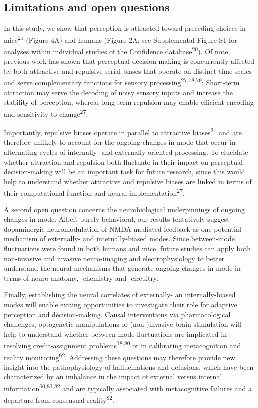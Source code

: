 \documentclass[
]{article}
\begin{document}
\hypertarget{limitations-and-open-questions}{%
\subsection{Limitations and open
questions}\label{limitations-and-open-questions}}

In this study, we show that perception is attracted toward preceding
choices in mice\textsuperscript{21} (Figure 4A) and humans (Figure 2A;
see Supplemental Figure S1 for analyses within individual studies of the
Confidence database\textsuperscript{20}). Of note, previous work has
shown that perceptual decision-making is concurrently affected by both
attractive and repulsive serial biases that operate on distinct
time-scales and serve complementary functions for sensory
processing\textsuperscript{27,78,79}: Short-term attraction may serve
the decoding of noisy sensory inputs and increase the stability of
perception, whereas long-term repulsion may enable efficient encoding
and sensitivity to change\textsuperscript{27}.

Importantly, repulsive biases operate in parallel to attractive
biases\textsuperscript{27} and are therefore unlikely to account for the
ongoing changes in mode that occur in alternating cycles of internally-
and externally-oriented processing. To elucidate whether attraction and
repulsion both fluctuate in their impact on perceptual decision-making
will be an important task for future research, since this would help to
understand whether attractive and repulsive biases are linked in terms
of their computational function and neural
implementation\textsuperscript{27}.

A second open question concerns the neurobiological underpinnings of
ongoing changes in mode. Albeit purely behavioral, our results
tentatively suggest dopaminergic neuromodulation of NMDA-mediated
feedback as one potential mechanism of externally- and internally-biased
modes. Since between-mode fluctuations were found in both humans and
mice, future studies can apply both non-invasive and invasive
neuro-imaging and electrophysiology to better understand the neural
mechanisms that generate ongoing changes in mode in terms of
neuro-anatomy, -chemistry and -circuitry.

Finally, establishing the neural correlates of externally- an
internally-biased modes will enable exiting opportunities to investigate
their role for adaptive perception and decision-making. Causal
interventions via pharmacological challenges, optogenetic manipulations
or (non-)invasive brain stimulation will help to understand whether
between-mode fluctuations are implicated in resolving credit-assignment
problems\textsuperscript{18,80} or in calibrating metacognition and
reality monitoring\textsuperscript{62}. Addressing these questions may
therefore provide new insight into the pathophysiology of hallucinations
and delusions, which have been characterized by an imbalance in the
impact of external versus internal information\textsuperscript{60,81,82}
and are typically associated with metacognitive failures and a departure
from consensual reality\textsuperscript{82}.
\end{document}
